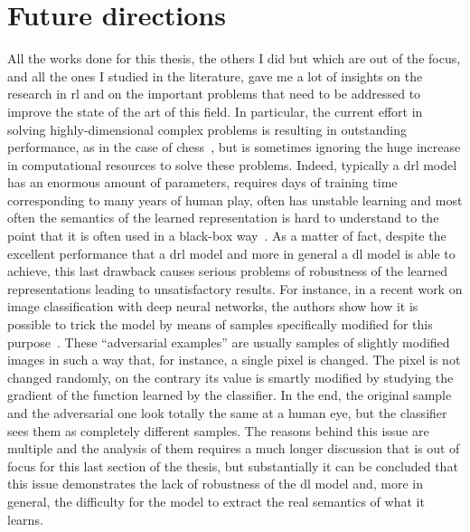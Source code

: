 \section{Future directions}
All the works done for this thesis, the others I did but which are out of the focus, and all the ones I studied in the literature, gave me a lot of insights on the research in \gls{rl} and on the important problems that need to be addressed to improve the state of the art of this field. In particular, the current effort in solving highly-dimensional complex problems is resulting in outstanding performance, as in the case of chess~\cite{silver2017chess}, but is sometimes ignoring the huge increase in computational resources to solve these problems. Indeed, typically a \gls{drl} model has an enormous amount of parameters, requires days of training time corresponding to many years of human play, often has unstable learning and most often the semantics of the learned representation is hard to understand to the point that it is often used in a black-box way~\cite{mnih2015human}. As a matter of fact, despite the excellent performance that a \gls{drl} model and more in general a \gls{dl} model is able to achieve, this last drawback causes serious problems of robustness of the learned representations leading to unsatisfactory results. For instance, in a recent work on image classification with deep neural networks, the authors show how it is possible to trick the model by means of samples specifically modified for this purpose~\cite{yuan2017adversarial}. These ``adversarial examples'' are usually samples of slightly modified images in such a way that, for instance, a single pixel is changed. The pixel is not changed randomly, on the contrary its value is smartly modified by studying the gradient of the function learned by the classifier. In the end, the original sample and the adversarial one look totally the same at a human eye, but the classifier sees them as completely different samples. The reasons behind this issue are multiple and the analysis of them requires a much longer discussion that is out of focus for this last section of the thesis, but substantially it can be concluded that this issue demonstrates the lack of robustness of the \gls{dl} model and, more in general, the difficulty for the model to extract the real semantics of what it learns.

